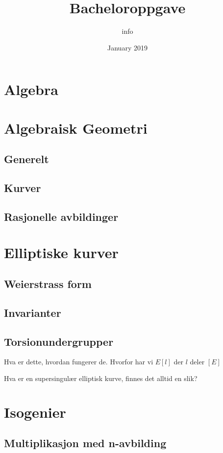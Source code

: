 \documentclass{article}
\title{Bacheloroppgave}
\author{info }
\date{January 2019}
\begin{document}
\maketitle

\tableofcontents

\newpage

\section{Algebra}
\section{Algebraisk Geometri}
\subsection{Generelt}

\subsection{Kurver}

\subsection{Rasjonelle avbildinger}

\section{Elliptiske kurver}
\subsection{Weierstrass form}
\subsection{Invarianter}
\subsection{Torsionundergrupper}
Hva er dette, hvordan fungerer de.
Hvorfor har vi $E[l]$ der $l$ deler $[E]$

Hva er en supersingulær elliptisk kurve, finnes det alltid en slik?
\section{Isogenier}

\subsection{Multiplikasjon med n-avbilding}
\end{document}

